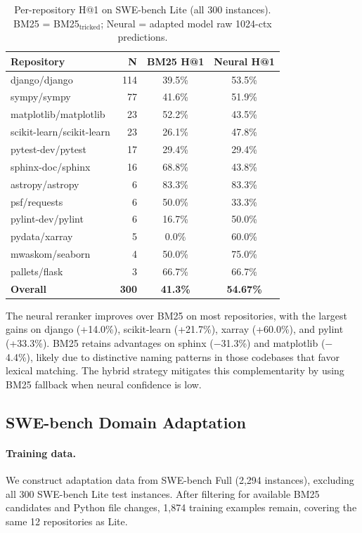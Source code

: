 \documentclass{article}
\begin{document}
\begin{table}[h]
\centering
\small
\caption{Per-repository H@1 on SWE-bench Lite (all 300 instances). BM25 = BM25$_\text{tricked}$; Neural = adapted model raw 1024-ctx predictions.}
\label{tab:perrepo}
\begin{tabular}{lrcc}
\toprule
\textbf{Repository} & \textbf{N} & \textbf{BM25 H@1} & \textbf{Neural H@1} \\
\midrule
django/django & 114 & 39.5\% & 53.5\% \\
sympy/sympy & 77 & 41.6\% & 51.9\% \\
matplotlib/matplotlib & 23 & 52.2\% & 43.5\% \\
scikit-learn/scikit-learn & 23 & 26.1\% & 47.8\% \\
pytest-dev/pytest & 17 & 29.4\% & 29.4\% \\
sphinx-doc/sphinx & 16 & 68.8\% & 43.8\% \\
astropy/astropy & 6 & 83.3\% & 83.3\% \\
psf/requests & 6 & 50.0\% & 33.3\% \\
pylint-dev/pylint & 6 & 16.7\% & 50.0\% \\
pydata/xarray & 5 & 0.0\% & 60.0\% \\
mwaskom/seaborn & 4 & 50.0\% & 75.0\% \\
pallets/flask & 3 & 66.7\% & 66.7\% \\
\midrule
\textbf{Overall} & \textbf{300} & \textbf{41.3\%} & \textbf{54.67\%} \\
\bottomrule
\end{tabular}
\end{table}

The neural reranker improves over BM25 on most repositories, with the largest gains on django (+14.0\%), scikit-learn (+21.7\%), xarray (+60.0\%), and pylint (+33.3\%).
BM25 retains advantages on sphinx ($-$31.3\%) and matplotlib ($-$4.4\%), likely due to distinctive naming patterns in those codebases that favor lexical matching.
The hybrid strategy mitigates this complementarity by using BM25 fallback when neural confidence is low.


\subsection{SWE-bench Domain Adaptation}
\label{app:adaptation}

\paragraph{Training data.}
We construct adaptation data from SWE-bench Full (2,294 instances), excluding all 300 SWE-bench Lite test instances.
After filtering for available BM25 candidates and Python file changes, 1,874 training examples remain, covering the same 12 repositories as Lite.
\end{document}
